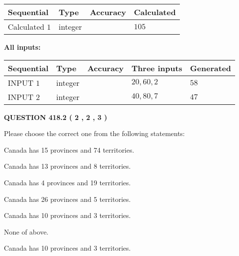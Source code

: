 \documentclass[12pt]{article}
\begin{document}
   
  
  
\noindent\begin{tabular}{|l|l|l|l|}
\hline
 Sequential & Type & Accuracy & Calculated \\ 
\hline
 
 
  Calculated $  1 $ & integer &  & 
  $ 105 $ 
 \\  \hline  
 \end{tabular}
   
   
   
   
\noindent\vspace{0.1in}\hspace{-0.08in} {\textbf{\Large{All inputs: }}}
   
   
  
  
\noindent\begin{tabular}{|l|l|l|l|l|}
\hline
 Sequential & Type & Accuracy & Three inputs & Generated \\ 
\hline
 
 
  INPUT $  1 $ & integer &  & $
 20
 , 
 60
 , 
 2
 $ & $ 58 $ 
 \\  \hline  
 
 
  INPUT $  2 $ & integer &  & $
 40
 , 
 80
 , 
 7
 $ & $ 47 $ 
 \\  \hline  
 \end{tabular}
   
   
  
\vspace{0.2in}
  
{\textbf{\Large{QUESTION
418.2 
 ( 2 , 2 , 3 )
}}}
  
  
Please choose the correct one from the following statements:
 
 
Canada has  15 provinces and  74 territories.
 
 
Canada has  13 provinces and  8 territories.
 
 
Canada has   4 provinces and  19 territories.
 
 
Canada has  26 provinces and  5 territories.
 
 
Canada has 10  provinces and 3 territories.
 
 
 None of above.
 
 
\noindent{}
 
 
Canada has 10  provinces and 3 territories.
 
\end{document}

